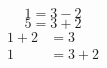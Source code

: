 \documentclass{article}
\begin{document}
	\begin{equation}
		1=3-2
	\end{equation}
	\begin{equation*}
		5=3+2
	\end{equation*}
     \begin{align*}
     	1+2 &=3\\
     	1 &=3+2
     \end{align*}
\end{document}
